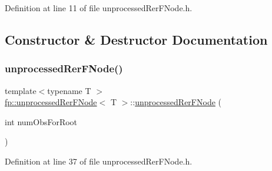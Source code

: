 Definition at line 11 of file unprocessed\+Rer\+F\+Node.\+h.



\subsection{Constructor \& Destructor Documentation}
\mbox{\label{classfp_1_1unprocessedRerFNode_a49970c4650bc7c448e29d6efd0dcfd34}} 
\subsubsection{\texorpdfstring{unprocessed\+Rer\+F\+Node()}{unprocessedRerFNode()}\hspace{0.1cm}{\footnotesize\ttfamily [1/2]}}
{\footnotesize\ttfamily template$<$typename T $>$ \\
\hyperlink{classfp_1_1unprocessedRerFNode}{fp\+::unprocessed\+Rer\+F\+Node}$<$ T $>$\+::\hyperlink{classfp_1_1unprocessedRerFNode}{unprocessed\+Rer\+F\+Node} (\begin{DoxyParamCaption}\item[{int}]{num\+Obs\+For\+Root }\end{DoxyParamCaption})\hspace{0.3cm}{\ttfamily [inline]}}



Definition at line 37 of file unprocessed\+Rer\+F\+Node.\+h.


